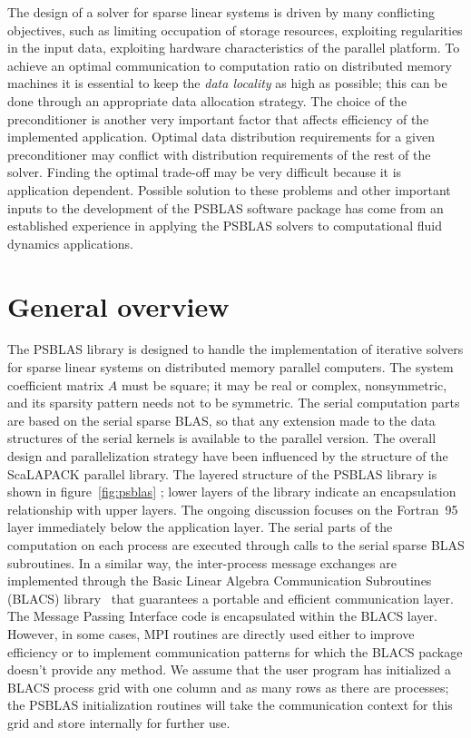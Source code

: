 The design of a solver for sparse linear systems is driven by many
conflicting objectives, such as limiting occupation of storage
resources, exploiting regularities in the input data, exploiting
hardware characteristics of the parallel platform.  To achieve an
optimal communication to computation ratio on distributed memory
machines it is essential to keep the {\em data locality} as high as
possible; this can be done through an appropriate data allocation
strategy.  The choice of the preconditioner is another very important
factor that affects efficiency of the implemented application. Optimal
data distribution requirements for a given preconditioner may conflict
with distribution requirements of the rest of the solver. Finding the
optimal trade-off may be very difficult because it is application
dependent.  Possible solution to these problems and other important
inputs to the development of the PSBLAS software package has come from
an established experience in applying the PSBLAS solvers to
computational fluid dynamics applications.

\section{General overview}
\label{sec:overview} 
The PSBLAS library is designed to handle the implementation of
iterative solvers for sparse linear systems on distributed memory
parallel computers.  The system coefficient matrix $A$ must be square;
it may be real or complex, nonsymmetric, and its sparsity pattern
needs not to be symmetric.  The serial computation parts are based on
the serial sparse BLAS, so that any extension made to the data
structures of the serial kernels is available to the parallel
version. The overall design and parallelization strategy have been
influenced by the structure of the ScaLAPACK parallel
library.  The layered structure of the PSBLAS library
is shown in figure~\ref{fig:psblas} ; lower layers of the library
indicate an encapsulation relationship with upper layers. The ongoing
discussion focuses on the Fortran~95 layer immediately below the
application layer.
The serial parts of the computation on each process are executed through
calls to the serial sparse BLAS subroutines. In a similar way, the
inter-process message exchanges are implemented through the Basic
Linear Algebra Communication Subroutines (BLACS) library~\cite{BLACS}
that guarantees a portable and efficient communication layer. The
Message Passing Interface code is encapsulated within the BLACS
layer. However, in some cases, MPI routines are directly used either
to improve efficiency or to implement communication patterns for which
the BLACS package doesn't provide any method. 
We assume that the user program has initialized a BLACS process grid
with one column and as many rows as there are processes; the PSBLAS
initialization routines will take the communication context for this
grid and store internally for further use. 

